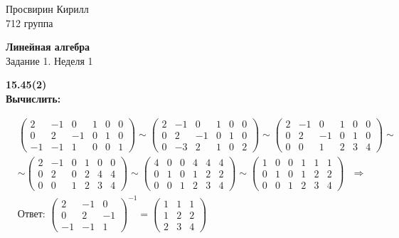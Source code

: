 \documentclass[a4paper,12pt]{article} %
\begin{document}

\hfill
\begin{minipage}{4.5cm}
	Просвирин Кирилл\\
	712 группа\\
\end{minipage}

\begin{center}
	\Large\textbf{Линейная алгебра\\} 
	\large Задание 1. Неделя 1
\end{center}

\noindent\textbf{15.45(2)\\Вычислить:}

\begin{align}\label{key}
	&\left(
		\begin{array}{ccc|ccc}
		2 & -1 & 0    & 1 & 0 & 0\\
		0 & 2 & -1    & 0 & 1 & 0\\
		-1 & -1 & 1   & 0 & 0 & 1
		\end{array}
	\right)
	\sim
	\left(
		\begin{array}{ccc|ccc}
		2 & -1 & 0    & 1 & 0 & 0\\
		0 & 2 & -1    & 0 & 1 & 0\\
		0 & -3 & 2    & 1 & 0 & 2
		\end{array}
	\right)
	\sim
	\left(
		\begin{array}{ccc|ccc}
		2 & -1 & 0    & 1 & 0 & 0\\
		0 & 2 & -1    & 0 & 1 & 0\\
		0 & 0 & 1     & 2 & 3 & 4
		\end{array}
	\right)
	\sim\\
	&\sim\left(
		\begin{array}{ccc|ccc}
		2 & -1 & 0    & 1 & 0 & 0\\
		0 & 2 & 0    & 2 & 4 & 4\\
		0 & 0 & 1     & 2 & 3 & 4
		\end{array}
	\right)
	\sim
	\left(
		\begin{array}{ccc|ccc}
		4 & 0 & 0    & 4 & 4 & 4\\
		0 & 1 & 0    & 1 & 2 & 2\\
		0 & 0 & 1     & 2 & 3 & 4
		\end{array}
	\right)
	\sim
	\left(
		\begin{array}{ccc|ccc}
		1 & 0 & 0    & 1 & 1 & 1\\
		0 & 1 & 0    & 1 & 2 & 2\\
		0 & 0 & 1     & 2 & 3 & 4
		\end{array}
	\right)~~~\Longrightarrow\\
	&\textbf{Ответ: }
	\left(
	\begin{array}{ccc}
	2 & -1 & 0\\
	0 & 2 & -1\\
	-1 & -1 & 1
	\end{array}
	\right)^{-1}
	=
	\left(
		\begin{array}{ccc}
		1 & 1 & 1\\
		1 & 2 & 2\\
		2 & 3 & 4
		\end{array}
	\right)
\end{align}
\end{document}
